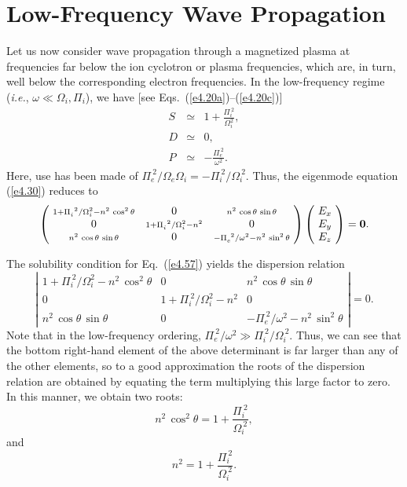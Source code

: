 \section{Low-Frequency Wave Propagation}\label{s4.8}
Let us now consider wave propagation through a magnetized plasma
at frequencies far below the ion cyclotron or plasma frequencies,
which are, in turn, well below the corresponding electron frequencies.
In the low-frequency regime ({\em i.e.}, $\omega\ll {\Omega}_i, {\Pi}_i$),
we have [see Eqs.~(\ref{e4.20a})--(\ref{e4.20c})]
\begin{eqnarray}
S &\simeq & 1 +\frac{{\Pi}_i^{~2}}{{\Omega}_i^2},\\[0.5ex]
D &\simeq & 0,\\[0.5ex]
P &\simeq & -\frac{{\Pi}_e^{~2}}{\omega^2}.
\end{eqnarray}
Here, use has been made of ${\Pi}_e^{~2}/{\Omega}_e{\Omega}_i
=-{\Pi}_i^{~2}/ {\Omega}_i^{~2}$. 
Thus, the eigenmode equation (\ref{e4.30}) reduces to 
\begin{equation}\label{e4.57}
 \left(\!\begin{array}{ccc}
{\scriptstyle 1+{\Pi}_i^{~2}/{\Omega}_i^2 - n^2\,\cos^2\theta} & 
0& {\scriptstyle n^2\,\cos\theta\,\sin\theta}\\
0 & {\scriptstyle  1+{\Pi}_i^{~2}/{\Omega}_i^2 - n^2 }    & 0 \\
{\scriptstyle n^2\,\cos\theta\,\sin\theta }& 0 & {\scriptstyle -{\Pi}_e^{~2}/\omega^2
 - n^2\,\sin^2\theta}
\end{array}\!\right)\left(\!
\begin{array}{c} E_x\\ E_y \\ E_z \end{array}\!\right) =
{\bf 0}.
\end{equation}

The solubility condition for Eq.~(\ref{e4.57}) yields the dispersion relation
\begin{equation}
\left| \!\begin{array}{ccc}
 1+{\Pi}_i^{~2}/{\Omega}_i^2 - n^2\,\cos^2\theta & 
0& n^2\,\cos\theta\,\sin\theta\\
0 &   1+{\Pi}_i^{~2}/{\Omega}_i^2 - n^2     & 0 \\
n^2\,\cos\theta\,\sin\theta & 0 & -{\Pi}_e^{~2}/\omega^2
 - n^2\,\sin^2\theta
\end{array}\!\right| = 0.
\end{equation}
Note that in the low-frequency ordering, ${\Pi}_e^{~2}/\omega^2\gg
{\Pi}_i^{~2}/{\Omega}_i^{~2}$. Thus, we can see that the bottom
right-hand   element of the above determinant  is far larger than any of the other
elements, so to a good approximation the roots of the dispersion relation 
are obtained
by equating the term multiplying this large factor to zero. In this manner,
we obtain two roots:
\begin{equation}
n^2\,\cos^2\theta = 1 + \frac{{\Pi}_i^{~2}}{{\Omega}_i^{~2}},
\end{equation}
and
\begin{equation}
n^2 = 1 +  \frac{{\Pi}_i^{~2}}{{\Omega}_i^{~2}}.
\end{equation}

